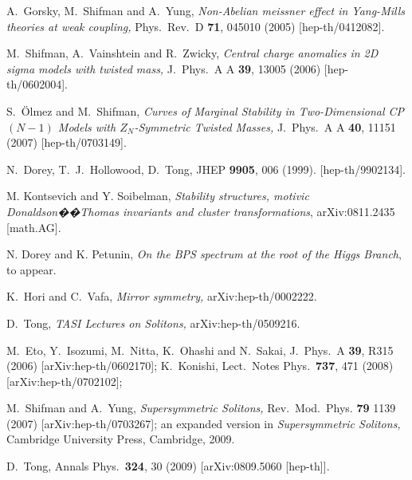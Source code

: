 \documentclass[epsfig,12pt]{article}
\begin{document}
\begin{thebibliography}{99}
  A.~Gorsky, M.~Shifman and A.~Yung,
 {\em Non-Abelian meissner effect in Yang-Mills theories at weak coupling,}
  Phys.\ Rev.\ D {\bf 71}, 045010 (2005)
  [hep-th/0412082].

  M.~Shifman, A.~Vainshtein and R.~Zwicky,
{\em Central charge anomalies in 2D sigma models with twisted mass,}
  J.\ Phys.\ A A {\bf 39}, 13005 (2006)
  [hep-th/0602004].
  
S.~\"Olmez and M.~Shifman,
{\em Curves of Marginal Stability in Two-Dimensional CP$(N-1)$ Models with $Z_N$-Symmetric Twisted Masses,}
  J.\ Phys.\ A A {\bf 40}, 11151 (2007)
  [hep-th/0703149].
  
  
  N.~Dorey, T.~J.~Hollowood, D.~Tong,
  JHEP {\bf 9905}, 006 (1999).
  [hep-th/9902134].

M.  Kontsevich and Y. Soibelman, 
{\em Stability structures, motivic Donaldson��Thomas invariants and cluster transformations},
arXiv:0811.2435 [math.AG].

N. Dorey and K. Petunin,
{\em On the BPS spectrum at the root of the Higgs Branch}, to appear.
  
  K.~Hori and C.~Vafa,
{\em Mirror symmetry,}
  arXiv:hep-th/0002222.

D.~Tong,
{\em TASI Lectures on Solitons,}
  arXiv:hep-th/0509216.

  M.~Eto, Y.~Isozumi, M.~Nitta, K.~Ohashi and N.~Sakai,
  J.\ Phys.\ A  {\bf 39}, R315 (2006)
  [arXiv:hep-th/0602170];
K.~Konishi,
  Lect.\ Notes Phys.\  {\bf 737}, 471 (2008)
  [arXiv:hep-th/0702102];

M.~Shifman and A.~Yung,
{\sl Supersymmetric Solitons,}
Rev.\ Mod.\ Phys. {\bf 79} 1139 (2007)
[arXiv:hep-th/0703267]; an expanded version in {\sl Supersymmetric Solitons,}
Cambridge University Press, Cambridge, 2009.

D.~Tong,
  Annals Phys.\  {\bf 324}, 30 (2009)
  [arXiv:0809.5060 [hep-th]].


\end{thebibliography}
\end{document}

